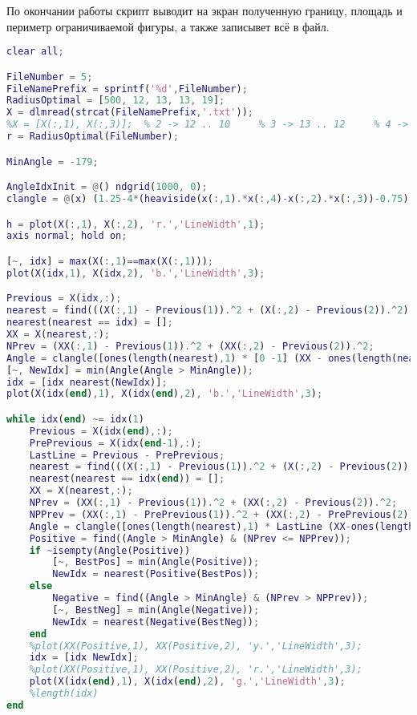 По окончании работы скрипт выводит на экран полученную границу, площадь и периметр ограничиваемой фигуры, а также записывет всё в файл.
\newpage
{}
\newpage
{}
\newpage
{}
\begin{lstlisting}[language=matlab, frame=lines]
clear all;

FileNumber = 5;
FileNamePrefix = sprintf('%d',FileNumber);
RadiusOptimal = [500, 12, 13, 13, 19];
X = dlmread(strcat(FileNamePrefix,'.txt'));
%X = [X(:,1), X(:,3)];  % 2 -> 12 .. 10     % 3 -> 13 .. 12     % 4 -> 13 .. 11     % 5 -> 19 only
r = RadiusOptimal(FileNumber);

MinAngle = -179;

AngleIdxInit = @() ndgrid(1000, 0);
clangle = @(x) (1.25-4*(heaviside(x(:,1).*x(:,4)-x(:,2).*x(:,3))-0.75).^2) .*acos((x(:,1).*x(:,3)+x(:,2).*x(:,4))./sqrt((x(:,1).^2+ x(:,2).^2) .*(x(:,3).^2+ x(:,4).^2)))*180/pi;

h = plot(X(:,1), X(:,2), 'r.','LineWidth',1);
axis normal; hold on;

[~, idx] = max(X(:,1)==max(X(:,1)));
plot(X(idx,1), X(idx,2), 'b.','LineWidth',3);

Previous = X(idx,:);
nearest = find(((X(:,1) - Previous(1)).^2 + (X(:,2) - Previous(2)).^2) < r^2);
nearest(nearest == idx) = [];
XX = X(nearest,:);
NPrev = (XX(:,1) - Previous(1)).^2 + (XX(:,2) - Previous(2)).^2;
Angle = clangle([ones(length(nearest),1) * [0 -1] (XX - ones(length(nearest),1) * Previous)]);
[~, NewIdx] = min(Angle(Angle > MinAngle));
idx = [idx nearest(NewIdx)];
plot(X(idx(end),1), X(idx(end),2), 'b.','LineWidth',3);

while idx(end) ~= idx(1)
    Previous = X(idx(end),:);
    PrePrevious = X(idx(end-1),:);
    LastLine = Previous - PrePrevious;
    nearest = find(((X(:,1) - Previous(1)).^2 + (X(:,2) - Previous(2)).^2) < r^2);
    nearest(nearest == idx(end)) = [];
    XX = X(nearest,:);
    NPrev = (XX(:,1) - Previous(1)).^2 + (XX(:,2) - Previous(2)).^2;
    NPPrev = (XX(:,1) - PrePrevious(1)).^2 + (XX(:,2) - PrePrevious(2)).^2;
    Angle = clangle([ones(length(nearest),1) * LastLine (XX-ones(length(nearest),1)*Previous) ] );
    Positive = find((Angle > MinAngle) & (NPrev <= NPPrev));
    if ~isempty(Angle(Positive))
        [~, BestPos] = min(Angle(Positive));
        NewIdx = nearest(Positive(BestPos));
    else
        Negative = find((Angle > MinAngle) & (NPrev > NPPrev));
        [~, BestNeg] = min(Angle(Negative));
        NewIdx = nearest(Negative(BestNeg));
    end
    %plot(XX(Positive,1), XX(Positive,2), 'y.','LineWidth',3);
    idx = [idx NewIdx];
    %plot(XX(Positive,1), XX(Positive,2), 'r.','LineWidth',3);
    plot(X(idx(end),1), X(idx(end),2), 'g.','LineWidth',3);
    %length(idx)
end


\end{lstlisting}
